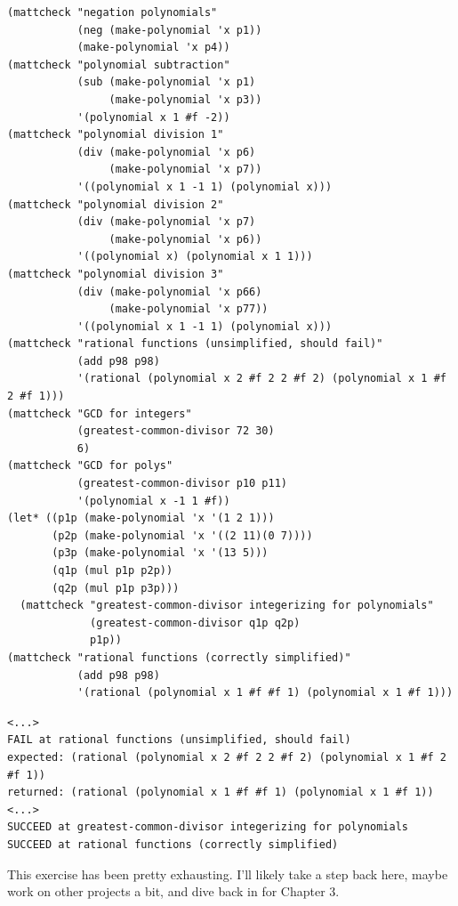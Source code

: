 \documentclass[final,fleqn,titlepage,twoside]{article}
\begin{document}
\begin{verbatim}
(mattcheck "negation polynomials"
           (neg (make-polynomial 'x p1))
           (make-polynomial 'x p4))
(mattcheck "polynomial subtraction"
           (sub (make-polynomial 'x p1)
                (make-polynomial 'x p3))
           '(polynomial x 1 #f -2))
(mattcheck "polynomial division 1"
           (div (make-polynomial 'x p6)
                (make-polynomial 'x p7))
           '((polynomial x 1 -1 1) (polynomial x)))
(mattcheck "polynomial division 2"
           (div (make-polynomial 'x p7)
                (make-polynomial 'x p6))
           '((polynomial x) (polynomial x 1 1)))
(mattcheck "polynomial division 3"
           (div (make-polynomial 'x p66)
                (make-polynomial 'x p77))
           '((polynomial x 1 -1 1) (polynomial x)))
(mattcheck "rational functions (unsimplified, should fail)"
           (add p98 p98)
           '(rational (polynomial x 2 #f 2 2 #f 2) (polynomial x 1 #f 2 #f 1)))
(mattcheck "GCD for integers"
           (greatest-common-divisor 72 30)
           6)
(mattcheck "GCD for polys"
           (greatest-common-divisor p10 p11)
           '(polynomial x -1 1 #f))
(let* ((p1p (make-polynomial 'x '(1 2 1)))
       (p2p (make-polynomial 'x '((2 11)(0 7))))
       (p3p (make-polynomial 'x '(13 5)))
       (q1p (mul p1p p2p))
       (q2p (mul p1p p3p)))
  (mattcheck "greatest-common-divisor integerizing for polynomials"
             (greatest-common-divisor q1p q2p)
             p1p))
(mattcheck "rational functions (correctly simplified)"
           (add p98 p98)
           '(rational (polynomial x 1 #f #f 1) (polynomial x 1 #f 1)))
\end{verbatim}

\begin{verbatim}
<...>
FAIL at rational functions (unsimplified, should fail)
expected: (rational (polynomial x 2 #f 2 2 #f 2) (polynomial x 1 #f 2 #f 1))
returned: (rational (polynomial x 1 #f #f 1) (polynomial x 1 #f 1))
<...>
SUCCEED at greatest-common-divisor integerizing for polynomials
SUCCEED at rational functions (correctly simplified)
\end{verbatim}

This exercise has been pretty exhausting. I'll likely take a step back here,
maybe work on other projects a bit, and dive back in for Chapter 3.
\end{document}
